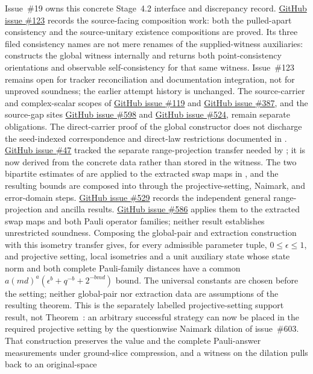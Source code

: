 \documentclass[11pt]{article}
\renewcommand{\ghissue}[1]{%
  \href{https://github.com/Dengnifer/MIPStarRE-QPBT/issues/#1}{GitHub issue \##1}}
\begin{document}
Issue~\#19 owns this concrete Stage~4.2 interface and discrepancy record.
\ghissue{123} records the source-facing composition work: both the pulled-apart
consistency and the source-unitary existence compositions are proved. Its three
filed consistency names are not mere renames of the supplied-witness auxiliaries:
 constructs the global witness internally
and returns both point-consistency orientations and observable self-consistency
for that same witness. Issue~\#123 remains open for tracker reconciliation and
documentation integration, not for unproved soundness; the earlier attempt
history is unchanged. The source-carrier and complex-scalar scopes of
\ghissue{119} and \ghissue{387}, and the source-gap sites \ghissue{598} and
\ghissue{524}, remain separate obligations.
The direct-carrier proof of the global constructor does not discharge the
seed-indexed correspondence and direct-law restrictions documented in
.
\ghissue{47} tracked the separate range-projection transfer needed
by ; it is now derived from the concrete data rather
than stored in the witness.  The two bipartite estimates of
 are applied to the
extracted swap maps in
, and the resulting
bounds are composed into  through the
projective-setting, Naimark, and error-domain steps.
\ghissue{529} records the independent general range-projection and ancilla
results. \ghissue{586} applies them to the extracted swap maps and both Pauli
operator families; neither result establishes unrestricted soundness.
Composing the global-pair and extraction construction with this isometry
transfer gives, for every admissible parameter tuple, $0\leq\epsilon\leq1$,
and projective setting, local isometries and a unit auxiliary state whose
state norm and both complete Pauli-family distances have a common
$a(md)^a(\epsilon^b+q^{-b}+2^{-bmd})$ bound. The universal constants are
chosen before the setting; neither global-pair nor extraction data are
assumptions of the resulting theorem. This is the separately labelled
projective-setting support result, not Theorem~: an arbitrary
successful strategy can now be placed in the required projective setting by
the questionwise Naimark dilation of issue~\#603. That construction preserves
the value and the complete Pauli-answer measurements under ground-slice
compression, and a witness on the dilation pulls back to an original-space
\end{document}
